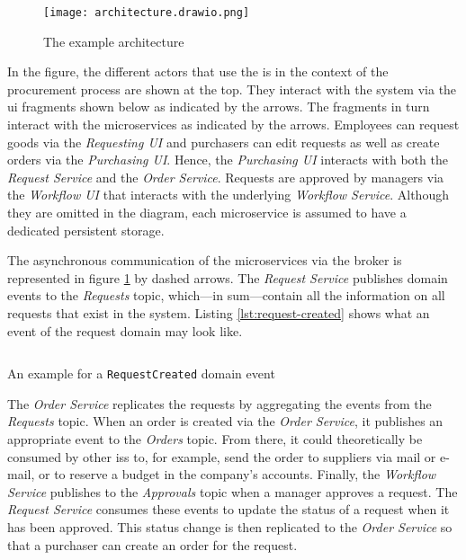 \begin{figure}[H]
  \centering
  \texttt{[image: architecture.drawio.png]}
  \caption{The example architecture}\label{fig:example-architecture}
\end{figure}

In the figure, the different actors that use the \gls{is} in the context of the procurement process are shown at the top.
They interact with the system via the \gls{ui} fragments shown below as indicated by the arrows.
The fragments in turn interact with the microservices as indicated by the arrows.
Employees can request goods via the \emph{Requesting UI} and purchasers can edit requests as well as create orders via the \emph{Purchasing UI}.
Hence, the \emph{Purchasing UI} interacts with both the \emph{Request Service} and the \emph{Order Service}.
Requests are approved by managers via the \emph{Workflow UI} that interacts with the underlying \emph{Workflow Service}.
Although they are omitted in the diagram, each microservice is assumed to have a dedicated persistent storage.

The asynchronous communication of the microservices via the broker is represented in figure \ref{fig:example-architecture} by dashed arrows.
The \emph{Request Service} publishes domain events to the \emph{Requests} topic, which---in sum---contain all the information on all requests that exist in the system.
Listing \ref{lst:request-created} shows what an event of the request domain may look like.

\begin{listing}[h]
  \inputminted{json}{assets/src/request-created.json}
  \caption{An example for a \texttt{RequestCreated} domain event}\label{lst:request-created}
\end{listing}

The \emph{Order Service} replicates the requests by aggregating the events from the \emph{Requests} topic.
When an order is created via the \emph{Order Service}, it publishes an appropriate event to the \emph{Orders} topic.
From there, it could theoretically be consumed by other \glspl{is} to, for example, send the order to suppliers via mail or e-mail, or to reserve a budget in the company's accounts.
Finally, the \emph{Workflow Service} publishes to the \emph{Approvals} topic when a manager approves a request.
The \emph{Request Service} consumes these events to update the status of a request when it has been approved.
This status change is then replicated to the \emph{Order Service} so that a purchaser can create an order for the request.

